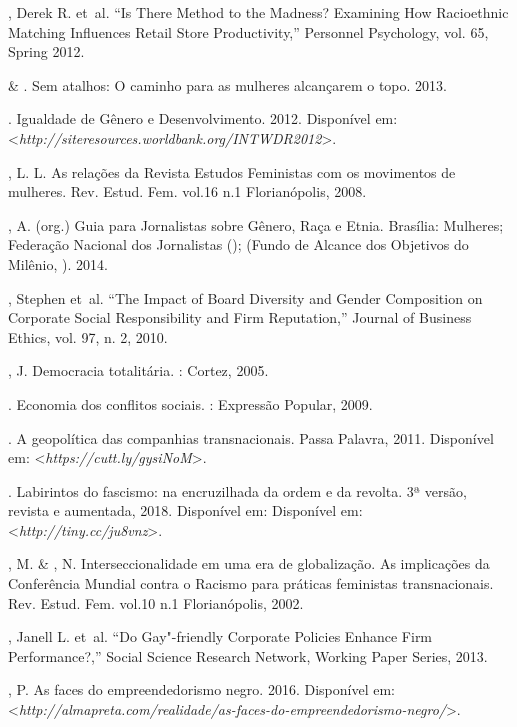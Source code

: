\begin{bibliohedra}
, Derek R. et~al. ``Is There Method to the Madness? Examining How
Racioethnic Matching Influences Retail Store Productivity,'' Personnel
Psychology, vol. 65, Spring 2012.

\mbox{} \& . Sem atalhos: O caminho para as mulheres alcançarem o
topo. 2013.

. Igualdade de Gênero e Desenvolvimento. 2012.
Disponível em: \textless{}\emph{http://siteresources.worldbank.org/INTWDR2012}\textgreater{}.

, L. L. As relações da Revista Estudos Feministas com os
movimentos de mulheres. Rev. Estud. Fem. vol.16 n.1 Florianópolis, 2008.

, A. (org.) Guia para Jornalistas sobre Gênero, Raça e Etnia.
Brasília:  Mulheres; Federação Nacional dos Jornalistas ();
(Fundo de Alcance dos Objetivos do Milênio, ). 2014.

, Stephen et~al. ``The Impact of Board Diversity and Gender
Composition on Corporate Social Responsibility and Firm Reputation,''
Journal of Business Ethics, vol. 97, n. 2, 2010.

, J. Democracia totalitária. : Cortez, 2005.

\titidem. Economia dos conflitos sociais. : Expressão
Popular, 2009.

\titidem. A geopolítica das companhias transnacionais. Passa
Palavra, 2011. Disponível em: \textless{}\emph{https://cutt.ly/gysiNoM}\textgreater{}.

\titidem. Labirintos do fascismo: na encruzilhada da ordem e
da revolta. 3ª versão, revista e aumentada, 2018. Disponível em:
Disponível em: \textless{}\emph{http://tiny.cc/ju8vnz}\textgreater{}.

, M. \& , N. Interseccionalidade em uma era de
globalização. As implicações da Conferência Mundial contra o Racismo
para práticas feministas transnacionais. Rev. Estud. Fem. vol.10 n.1
Florianópolis, 2002.

, Janell L. et~al. ``Do Gay"-friendly Corporate Policies
Enhance Firm Performance?,'' Social Science Research Network, Working
Paper Series, 2013.

, P. As faces do empreendedorismo negro. 2016.
Disponível em: \textless{}\emph{http://almapreta.com/realidade/as-faces-do-empreendedorismo-negro/}\textgreater{}.


\end{bibliohedra}
